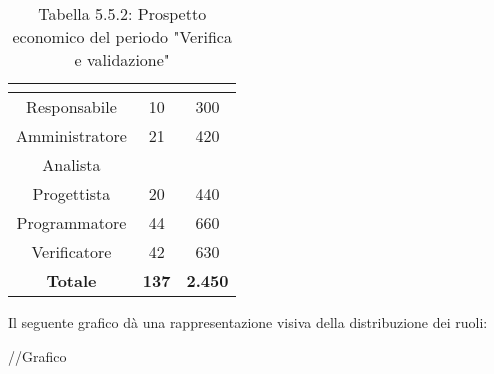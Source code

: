 \renewcommand{\arraystretch}{1.5}
\begin{table}[H]
\begin{center}
\begin{tabular}{|c|c|c|}
\hline
\rowcolor{title_row}
\textbf{\color{title_text}{Ruolo}}  & \textbf{\color{title_text}{Ore}} & \textbf{\color{title_text}{Costo in \euro}} \\ \hline
Responsabile    & 10 & 300 \\ \hline
Amministratore  & 21 & 420 \\ \hline
Analista        & & \\ \hline
Progettista     & 20 & 440 \\ \hline
Programmatore   & 44 & 660 \\ \hline
Verificatore    & 42 & 630 \\ \hline
\textbf{Totale} & \textbf{137}    & \textbf{2.450}           \\ \hline
\end{tabular}
\caption{Tabella 5.5.2: Prospetto economico del periodo "Verifica e validazione"\label{}}
\end{center}
\end{table}
\renewcommand{\arraystretch}{1}

Il seguente grafico dà una rappresentazione visiva della distribuzione dei ruoli: \\
\begin{center}
//Grafico
\end{center}
 
\pagebreak
